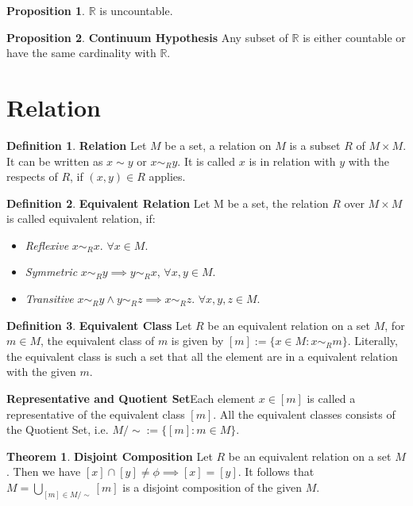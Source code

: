 \documentclass{article}
\theoremstyle{definition}
\newtheorem{defi}{Definition}[subsection]
\newtheorem{theorem}{Theorem}[subsection]
\newtheorem{prop}{Proposition}[subsection]
\begin{document}
\begin{prop}
$\mathbb{R}$ is uncountable.
\end{prop}

\begin{prop}
\textbf{Continuum Hypothesis} Any subset of $\mathbb{R}$ is either countable or have the same cardinality with $\mathbb{R}$.
\end{prop}

\section{Relation}

\begin{defi}
\textbf{Relation} Let $M$ be a set, a relation on $M$ is a subset $R$ of $M \times M$. It can be written as $x \sim y$ or $x\sim_{R}y$. It is called $x$ is in relation with $y$ with the respects of $R$, if $(x,y)\in R$ applies.
\end{defi}

\begin{defi}
\textbf{Equivalent Relation} Let M be a set, the relation $R$ over $M \times M$ is called equivalent relation, if: 
\begin{itemize}
    \item \textit{Reflexive} $x \sim_R x$. $\forall x\in M$.
    \item \textit{Symmetric} $x \sim_R y \implies y \sim_R x$, $\forall x, y \in M$.
    \item \textit{Transitive} $x \sim_R y \land y \sim_R z \implies x \sim_R z$. $\forall x, y, z \in M$.
\end{itemize}
\end{defi}

\begin{defi}
\textbf{Equivalent Class} Let $R$ be an equivalent relation on a set $M$, for $m \in M$, the equivalent class of $m$ is given by $[m] := \{x \in M: x\sim_R m\}$. Literally, the equivalent class is such a set that all the element are in a equivalent relation with the given $m$.

\textbf{Representative and Quotient Set}Each element $x \in [m]$ is called a representative of the equivalent class $[m]$. All the equivalent classes consists of the Quotient Set, i.e. $M / \sim := \{[m]: m\in M\}$.

\end{defi}

\begin{theorem}
\textbf{Disjoint Composition} Let $R$ be an equivalent relation on a set $M$. Then we have $[x] \cap [y] \neq \phi \implies [x]=[y]$. It follows that $M=\bigcup_{[m]\in M/\sim}[m]$ is a disjoint composition of the given $M$.
\end{theorem}
\end{document}
